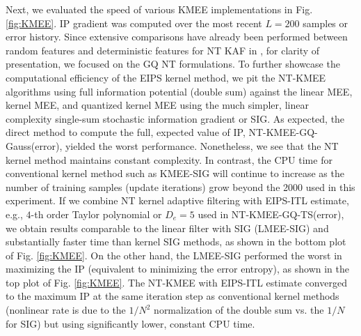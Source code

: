 \documentclass[8pt,twocolumn]{IEEEtran}
\begin{document}
Next, we evaluated the speed of various KMEE implementations in Fig. \ref{fig:KMEE}. IP gradient was computed over the most recent $L=200$ samples or error history. Since extensive comparisons have already been performed between random features and deterministic features for NT KAF in \cite{Li2019notrick}, for clarity of presentation, we focused on the GQ NT formulations. To further showcase the computational efficiency of the EIPS kernel method, we pit the NT-KMEE algorithms using full information potential (double sum) against the linear MEE, kernel MEE, and quantized kernel MEE using the much simpler, linear complexity single-sum stochastic information gradient or SIG. As expected, the direct method to compute the full, expected value of IP, NT-KMEE-GQ-Gauss(error), yielded the worst performance. Nonetheless, we see that the NT kernel method maintains constant complexity. In contrast, the CPU time for conventional kernel method such as KMEE-SIG will continue to increase as the number of training samples (update iterations) grow beyond the 2000 used in this experiment. If we combine NT kernel adaptive filtering with EIPS-ITL estimate, e.g., $4$-th order Taylor polynomial or $D_e = 5$ used in NT-KMEE-GQ-TS(error), we obtain results comparable to the linear filter with SIG (LMEE-SIG) and substantially faster time than kernel SIG methods, as shown in the bottom plot of Fig. \ref{fig:KMEE}. On the other hand, the LMEE-SIG performed the worst in maximizing the IP (equivalent to minimizing the error entropy), as shown in the top plot of Fig. \ref{fig:KMEE}. The NT-KMEE with EIPS-ITL estimate converged to the maximum IP at the same iteration step as conventional kernel methods (nonlinear rate is due to the $1/N^2$ normalization of the double sum vs. the $1/N$ for SIG) but using significantly lower, constant CPU time.
\end{document}
